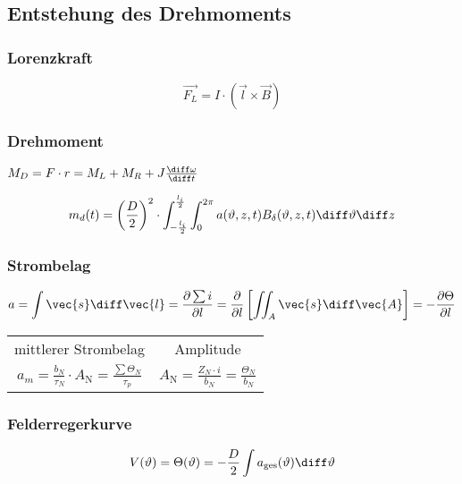 \begin{sectionbox}
\subsection{Entstehung des Drehmoments}
\subsubsection{Lorenzkraft}

\[\vec{F_L} = I\cdot (\vec{l}\times \vec{B})\]

\subsubsection{Drehmoment}
\begin{emphbox}
  $M_D = F\cdot r = M_L + M_R + J\frac{\diff\omega}{\diff t}$
\end{emphbox}
\[m_d(t) = \left(\frac{D}{2}\right)^2\cdot\int_{-\frac{l_i}{2}}^{\frac{l_i}{2}}\int_{0}^{2\pi}a(\vartheta,z,t)B_\delta(\vartheta,z,t)\diff\vartheta\diff z\]

\subsubsection{Strombelag}
\begin{align*}
a = \int\vec{s}\diff\vec{l} = \frac{\partial\sum i}{\partial l} = \frac{\partial}{\partial l}\left[\iint_A \vec{s}\diff\vec{A}\right] = -\frac{\partial\Theta}{\partial l}
\end{align*}
\begin{tabularx}{\columnwidth}{CC}
mittlerer Strombelag & Amplitude\\
$a_m = \frac{b_N}{\tau_N}\cdot A_\text{N} = \frac{\sum\Theta_N}{\tau_p}$ & $A_\text{N} = \frac{Z_N\cdot i}{b_N} = \frac{\Theta_N}{b_N}$
\end{tabularx}

\subsubsection{Felderregerkurve}
\[V(\vartheta) = \Theta(\vartheta) = -\frac{D}{2}\int a_\text{ges}(\vartheta)\diff\vartheta\]
\end{sectionbox}


